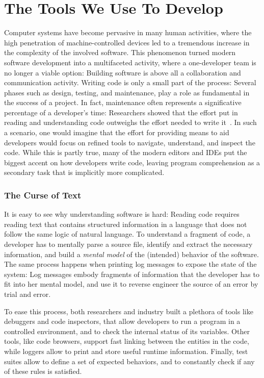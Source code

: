 \newpage


\section{The Tools We Use To Develop} \label{sec:reified-introduction}

Computer systems have become pervasive in many human activities, where the high penetration of machine-controlled devices led to a tremendous increase in the complexity of the involved software.
This phenomenon turned modern software development into a multifaceted activity, where a one-developer team is no longer a viable option: Building software is above all a collaboration and communication activity.
Writing code is only a small part of the process: Several phases such as design, testing, and maintenance, play a role as fundamental in the success of a project.
In fact, maintenance often represents a significative percentage of a developer's time: Researchers showed that the effort put in reading and understanding code outweighs the effort needed to write it~\cite{Corb1989,Fjel1983,Zelk1979,Mine2015b}.
In such a scenario, one would imagine that the effort for providing means to aid developers would focus on refined tools to navigate, understand, and inspect the code.
While this is partly true, many of the modern editors and IDEs put the biggest accent on how developers write code, leaving program comprehension as a secondary task that is implicitly more complicated.


\subsubsection{The Curse of Text}

It is easy to see why understanding software is hard: Reading code requires reading text that contains structured information in a language that does not follow the same logic of natural language.
To understand a fragment of code, a developer has to mentally parse a source file, identify and extract the necessary information, and build a \emph{mental model} of the (intended) behavior of the software.
The same process happens when printing log messages to expose the state of the system: Log messages embody fragments of information that the developer has to fit into her mental model, and use it to reverse engineer the source of an error by trial and error.

To ease this process, both researchers and industry built a plethora of tools like debuggers and code inspectors, that allow developers to run a program in a controlled environment, and to check the internal status of its variables.
Other tools, like code browsers, support fast linking between the entities in the code, while loggers allow to print and store useful runtime information.
Finally, test suites allow to define a set of expected behaviors, and to constantly check if any of these rules is satisfied.

